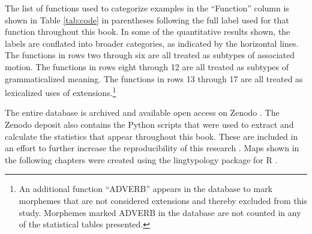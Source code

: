 
\largerpage[-1]
The list of functions used to categorize examples in the ``Function'' column is shown in Table \ref{tab:code} in parentheses following the full label used for that function throughout this book. In some of the quantitative results shown, the labels are conflated into broader categories, as indicated by the horizontal lines. The functions in rows two through six are all treated as subtypes of associated motion. The functions in rows eight through 12 are all treated as subtypes of grammaticalized meaning. The functions in rows 13 through 17 are all treated as lexicalized uses of extensions.\footnote{An
    additional function ``ADVERB'' appears in the database to mark morphemes that are not considered extensions and thereby excluded from this study. Morphemes marked ADVERB in the database are not counted in any of the statistical tables presented.
    }


The entire database is archived and available open access on Zenodo \citep{lovestrandDirectionalsChadic2023}. The Zenodo deposit also contains the Python scripts that were used to extract and calculate the statistics that appear throughout this book. These are included in an effort to further increase the reproducibility of this research \citep[48]{winterStatisticsLinguistsIntroduction2019}. Maps shown in the following chapters were created using the lingtypology package for R \citep{morozLingtypologyEasyMapping2017}.
